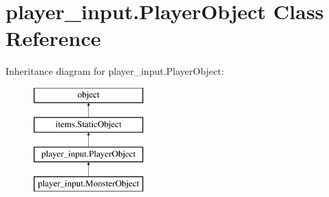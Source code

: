 \hypertarget{classplayer__input_1_1_player_object}{}\section{player\+\_\+input.\+Player\+Object Class Reference}
\label{classplayer__input_1_1_player_object}
Inheritance diagram for player\+\_\+input.\+Player\+Object\+:\begin{figure}[H]
\begin{center}
\leavevmode
\includegraphics[height=4.000000cm]{classplayer__input_1_1_player_object}
\end{center}
\end{figure}
